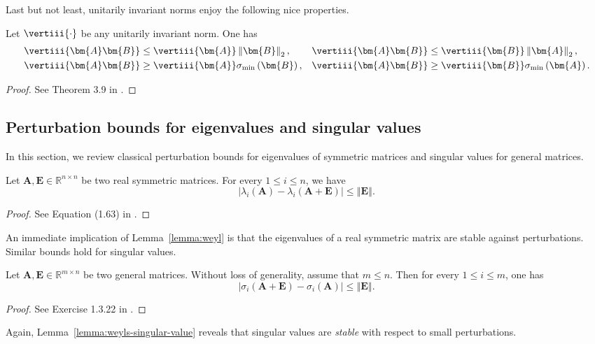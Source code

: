 Last but not least, unitarily invariant norms enjoy the following
nice properties.

\begin{proposition}\label{prop:unitary_norm_relation}Let $\vertiii{\cdot}$ be any unitarily invariant norm.
One has 
\begin{align*}
\vertiii{\bm{A}\bm{B}} & \leq\vertiii{\bm{A}}\left\Vert \bm{B}\right\Vert _{2}, &  & \vertiii{\bm{A}\bm{B}}\leq\vertiii{\bm{B}}\left\Vert \bm{A}\right\Vert _{2},\\
\vertiii{\bm{A}\bm{B}} & \geq\vertiii{\bm{A}}\sigma_{\min}\left(\bm{B}\right), &  & \vertiii{\bm{A}\bm{B}}\geq\vertiii{\bm{B}}\sigma_{\min}\left(\bm{A}\right).
\end{align*}
\end{proposition}
\begin{proof}See Theorem 3.9 in \citep{stewart1990matrix}.\end{proof}

\subsection{Perturbation bounds for eigenvalues and singular values}


In this section, we review classical perturbation
bounds for eigenvalues of symmetric matrices and singular values for general matrices. 

\begin{lemma}\label{lemma:weyl}Let
$\bm{A},\bm{E}\in\mathbb{R}^{n\times n}$ be two real symmetric matrices.
For every $1\leq i\leq n$, we have 
\begin{equation}
\left|\lambda_{i}\left(\bm{A}\right)-\lambda_{i}\left(\bm{A} +\bm{E}\right)\right|\leq\left\Vert \bm{E}\right\Vert .\label{eq:weyl}
\end{equation}
\end{lemma}
\begin{proof}See Equation (1.63) in \citep{Tao2012RMT}. \end{proof}


An immediate implication of Lemma~\ref{lemma:weyl} is that the eigenvalues
of a real symmetric matrix are stable against perturbations. Similar bounds hold for singular values.


\begin{lemma}\label{lemma:weyls-singular-value}Let
$\bm{A},\bm{E}\in\mathbb{R}^{m\times n}$ be two general matrices.
Without loss of generality, assume that $m\leq n$. Then for every
$1\leq i\leq m$, one has 
\[
\left|\sigma_{i}\left(\bm{A}+\bm{E}\right)-\sigma_{i}\left(\bm{A}\right)\right|\leq\left\Vert \bm{E}\right\Vert .
\]
\end{lemma}
\begin{proof}See Exercise 1.3.22 in \citep{Tao2012RMT}. \end{proof}
Again, Lemma~\ref{lemma:weyls-singular-value} reveals that singular
values are \emph{stable }with respect to small perturbations.


